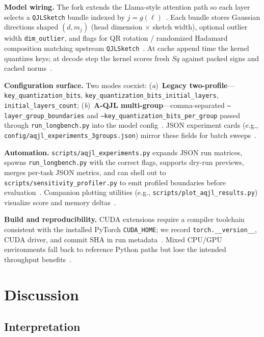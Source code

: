 \documentclass[conference]{IEEEtran}
\begin{document}
\textbf{Model wiring.} The fork extends the Llama-style attention path so each layer selects a \texttt{QJLSketch} bundle indexed by \(j=g(\ell)\)~\cite{zandieh2024aqjl-repo}. Each bundle stores Gaussian directions shaped \((d,m_j)\) (head dimension \(\times\) sketch width), optional outlier width \texttt{dim\_outlier}, and flags for QR rotation / randomized Hadamard composition matching upstream \texttt{QJLSketch}~\cite{qjlkernel,zandieh2024aqjl-repo}. At cache append time the kernel quantizes keys; at decode step the kernel scores fresh \(Sq\) against packed signs and cached norms~\cite{zandieh2024qjl,qjlkernel}.

\textbf{Configuration surface.} Two modes coexist: (\emph{a})~\textbf{Legacy two-profile}---\texttt{key\_quantization\_bits}, \texttt{key\_quantization\_bits\_initial\_layers}, \texttt{initial\_layers\_count}; (\emph{b})~\textbf{A-QJL multi-group}---comma-separated \texttt{--layer\_group\_boundaries} and \texttt{--key\_quantization\_bits\_per\_group} passed through \texttt{run\_longbench.py} into the model config~\cite{zandieh2024aqjl-repo}. JSON experiment cards (e.g., \texttt{config/aqjl\_experiments\_3groups.json}) mirror these fields for batch sweeps~\cite{zandieh2024aqjl-repo,presentation_mqjl}.

\textbf{Automation.} \texttt{scripts/aqjl\_experiments.py} expands JSON run matrices, spawns \texttt{run\_longbench.py} with the correct flags, supports dry-run previews, merges per-task JSON metrics, and can shell out to \texttt{scripts/sensitivity\_profiler.py} to emit profiled boundaries before evaluation~\cite{presentation_mqjl}. Companion plotting utilities (e.g., \texttt{scripts/plot\_aqjl\_results.py}) visualize score and memory deltas~\cite{presentation_mqjl}.

\textbf{Build and reproducibility.} CUDA extensions require a compiler toolchain consistent with the installed PyTorch \texttt{CUDA\_HOME}; we record \texttt{torch.\_\_version\_\_}, CUDA driver, and commit SHA in run metadata~\cite{qjlkernel,presentation_mqjl}. Mixed CPU/GPU environments fall back to reference Python paths but lose the intended throughput benefits~\cite{zandieh2024qjl}.

\section{Discussion}
\label{sec:discussion}

\subsection{Interpretation}
\end{document}
